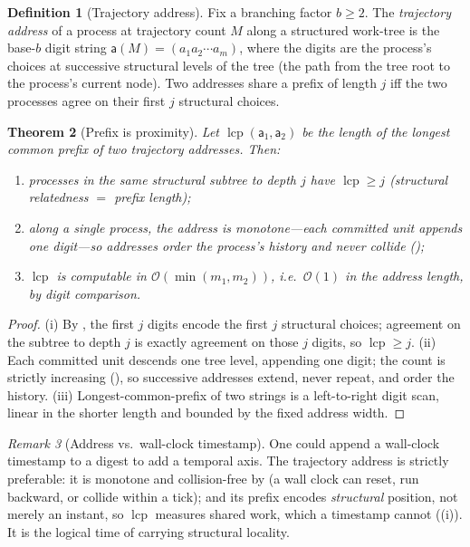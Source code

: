 \documentclass[twocolumn,10pt,a4paper]{article}
\theoremstyle{thmstyle}
\newtheorem{theorem}{Theorem}[section]
\theoremstyle{definition}
\newtheorem{definition}[theorem]{Definition}
\theoremstyle{remark}
\newtheorem{remark}[theorem]{Remark}
\newcommand{\Mcount}{M}
\newcommand{\Addr}{\mathsf{a}}
\DeclareMathOperator{\lcp}{lcp}
\begin{document}
\begin{definition}[Trajectory address]
\label{def:address}
Fix a branching factor $b\ge 2$. The \emph{trajectory address} of a
process at trajectory count $\Mcount$ along a structured work-tree is the
base-$b$ digit string $\Addr(\Mcount)=(a_1 a_2\cdots a_m)$, where the
digits are the process's choices at successive structural levels of the
tree (the path from the tree root to the process's current node). Two
addresses share a prefix of length $j$ iff the two processes agree on
their first $j$ structural choices.
\end{definition}

\begin{theorem}[Prefix is proximity]
\label{thm:prefix}
Let $\lcp(\Addr_1,\Addr_2)$ be the length of the longest common prefix of
two trajectory addresses. Then:
\begin{enumerate}[label=\textup{(\roman*)},leftmargin=2.2em,itemsep=2pt]
\item processes in the same structural subtree to depth $j$ have
$\lcp\ge j$ (structural relatedness $=$ prefix length);
\item along a single process, the address is monotone---each committed
unit appends one digit---so addresses order the process's history and
never collide ();
\item $\lcp$ is computable in $\mathcal{O}(\min(m_1,m_2))$, i.e.\
$\mathcal{O}(1)$ in the address length, by digit comparison.
\end{enumerate}
\end{theorem}

\begin{proof}
(i) By , the first $j$ digits encode the first $j$
structural choices; agreement on the subtree to depth $j$ is exactly
agreement on those $j$ digits, so $\lcp\ge j$. (ii) Each committed unit
descends one tree level, appending one digit; the count is strictly
increasing (\Cref{thm:monotone}), so successive addresses extend, never
repeat, and order the history. (iii) Longest-common-prefix of two strings
is a left-to-right digit scan, linear in the shorter length and bounded by
the fixed address width.
\end{proof}

\begin{remark}[Address vs.\ wall-clock timestamp]
\label{rem:vs-timestamp}
One could append a wall-clock timestamp to a digest to add a temporal
axis. The trajectory address is strictly preferable: it is monotone and
collision-free by \Cref{thm:monotone} (a wall clock can reset, run
backward, or collide within a tick); and its prefix encodes
\emph{structural} position, not merely an instant, so $\lcp$ measures
shared work, which a timestamp cannot
((i)). It is the logical time of
\citep{lamport1978,fidge1988,mattern1989} carrying structural locality.
\end{remark}
\end{document}
